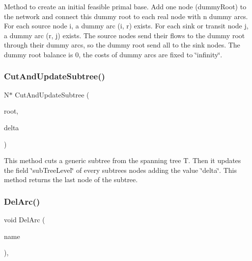 Method to create an initial feasible primal base. Add one node (dummy\+Root) to the network and connect this dummy root to each real node with n dummy arcs. For each source node i, a dummy arc (i, r) exists. For each sink or transit node j, a dummy arc (r, j) exists. The source nodes send their flows to the dummy root through their dummy arcs, so the dummy root send all to the sink nodes. The dummy root balance is 0, the costs of dummy arcs are fixed to \char`\"{}infinity\char`\"{}. \mbox{\label{class_m_c_f_simplex_a45c07b1bf138391205e7b99325177723}} 
\subsubsection{\texorpdfstring{Cut\+And\+Update\+Subtree()}{CutAndUpdateSubtree()}}
{\footnotesize\ttfamily N$\ast$ Cut\+And\+Update\+Subtree (\begin{DoxyParamCaption}\item[{N $\ast$}]{root,  }\item[{int}]{delta }\end{DoxyParamCaption})\hspace{0.3cm}{\ttfamily [private]}}

This method cuts a generic subtree from the spanning tree T. Then it updates the field \char`\"{}sub\+Tree\+Level\char`\"{} of every subtree\textquotesingle{}s nodes adding the value \char`\"{}delta\char`\"{}. This method returns the last node of the subtree. \mbox{\label{class_m_c_f_simplex_a3b6145c95b83f40a76d724eb2b92f80f}} 
\subsubsection{\texorpdfstring{Del\+Arc()}{DelArc()}}
{\footnotesize\ttfamily void Del\+Arc (\begin{DoxyParamCaption}\item[{\mbox{\hyperlink{class_m_c_f_class_a76aaabb20535c51a2752b93f6c38fe54}{c\+Index}}}]{name }\end{DoxyParamCaption})\hspace{0.3cm}{\ttfamily [override]}, {\ttfamily [virtual]}}

